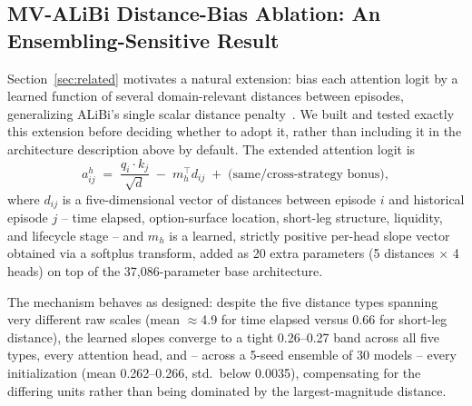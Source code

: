 \documentclass[sigconf,review]{acmart}
\begin{document}
\subsection{MV-ALiBi Distance-Bias Ablation: An Ensembling-Sensitive Result}
\label{sec:mvalibi-ablation}
Section~\ref{sec:related} motivates a natural extension: bias each attention logit by a learned function of several domain-relevant distances between episodes, generalizing ALiBi's single scalar distance penalty~\cite{press2022alibi}. We built and tested exactly this extension before deciding whether to adopt it, rather than including it in the architecture description above by default. The extended attention logit is
\[
a_{ij}^{h} \;=\; \frac{q_i \cdot k_j}{\sqrt{d}} \;-\; m_h^{\top} d_{ij} \;+\; \text{(same/cross-strategy bonus)},
\]
where $d_{ij}$ is a five-dimensional vector of distances between episode $i$ and historical episode $j$ -- time elapsed, option-surface location, short-leg structure, liquidity, and lifecycle stage -- and $m_h$ is a learned, strictly positive per-head slope vector obtained via a softplus transform, added as 20 extra parameters (5 distances $\times$ 4 heads) on top of the 37{,}086-parameter base architecture.

The mechanism behaves as designed: despite the five distance types spanning very different raw scales (mean $\approx$4.9 for time elapsed versus 0.66 for short-leg distance), the learned slopes converge to a tight 0.26--0.27 band across all five types, every attention head, and -- across a 5-seed ensemble of 30 models -- every initialization (mean 0.262--0.266, std.\ below 0.0035), compensating for the differing units rather than being dominated by the largest-magnitude distance.
\end{document}
